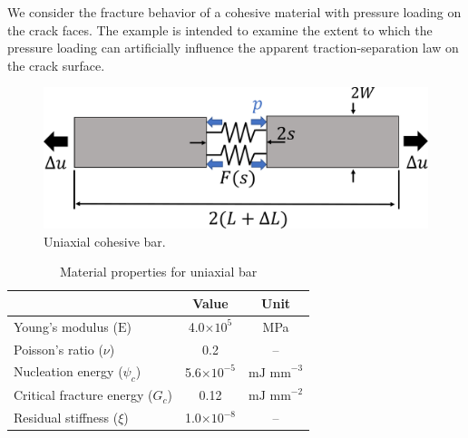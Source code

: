 
We consider the fracture behavior of a cohesive material with pressure loading on the crack faces.  The example is intended to examine the extent to which the pressure loading can artificially influence the apparent traction-separation law on the crack surface.  


\begin{figure}[h]
    \centering
    \includegraphics[width=.6\linewidth]{images/traction_separation/uniaxial_cohesive.pdf}
    \caption{Uniaxial cohesive bar.}
    \label{fig:1d_problem_schematic}
\end{figure}

\begin{table}[h]
\centering
\caption{Material properties for uniaxial bar}
\begin{tabular}[t]{lcc}
\hline
&Value &Unit \\
\hline
Young's modulus ($\text{E}$)&4.0$\times10^5$&MPa\\
Poisson's ratio ($\nu$)&0.2&--\\
 Nucleation energy  ($\psi_c$)&5.6$\times10^{-5}$&$\text{mJ mm}^{-3}$\\
Critical fracture energy ($G_c$)&0.12&$\text{mJ mm}^{-2}$\\
Residual stiffness ($\xi$)&1.0$\times10^{-8}$&--\\
\hline
\end{tabular}
\label{material_properties_p1}
\end{table}%

